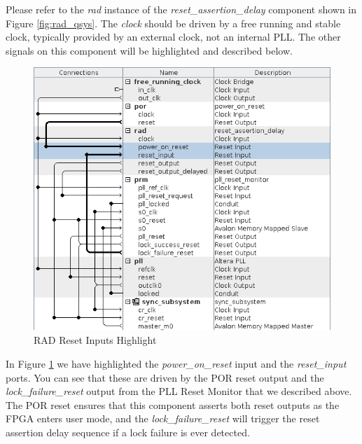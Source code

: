 \documentclass{article}
\begin{document}
\begin{flushleft}
Please refer to the \emph{rad} instance of the \emph{reset\_assertion\_delay} component shown in Figure \ref{fig:rad_qsys}.  The \emph{clock} should be driven by a free running and stable clock, typically provided by an external clock, not an internal PLL.  The other signals on this component will be highlighted and described below.

\begin{figure}[H]
\centering
\includegraphics[scale=0.675]{rad_reset_inputs}
\caption{RAD Reset Inputs Highlight}
\label{fig:rad_reset_inputs}
\end{figure}

In Figure \ref{fig:rad_reset_inputs} we have highlighted the \emph{power\_on\_reset} input and the \emph{reset\_input} ports.  You can see that these are driven by the POR reset output and the \emph{lock\_failure\_reset} output from the PLL Reset Monitor that we described above.  The POR reset ensures that this component asserts both reset outputs as the FPGA enters user mode, and the \emph{lock\_failure\_reset} will trigger the reset assertion delay sequence if a lock failure is ever detected.


\end{flushleft}
\end{document}

